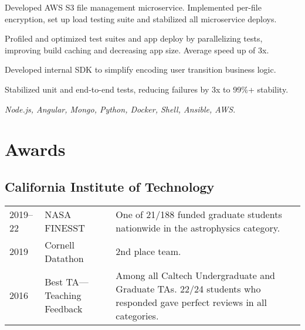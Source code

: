 \documentclass[]{yubo-resume-openfont}
\begin{document}
\begin{minipage}[t]{0.66\textwidth}
{    
    \begin{tightemize}
        \item Developed AWS S3 file management microservice. Implemented
            per-file encryption, set up load testing suite and stabilized all
            microservice deploys.
        \item Profiled and optimized test suites and app deploy by parallelizing
            tests, improving build caching and decreasing app size. Average
            speed up of 3x.
        \item Developed internal SDK to simplify encoding user transition
            business logic.
        \item Stabilized unit and end-to-end tests, reducing failures by 3x to
            99\%+ stability.
        \item \emph{Node.js, Angular, Mongo, Python, Docker, Shell, Ansible,
            AWS}.
    \end{tightemize}
}

\ifisCS
    \ExperienceSec
    \ResearchSec
\else
    \ResearchSec
    \ExperienceSec
\fi


\section{Awards}
\subsection{California Institute of Technology}
\begin{tabular}{p{50pt}p{80pt}p{7.5cm}}
    2019--22 & NASA FINESST & One of 21/188 funded graduate students nationwide
    in the astrophysics category.\\
    2019 & Cornell Datathon & 2nd place team.\\
    2016 & Best TA---Teaching Feedback & Among all Caltech Undergraduate and
    Graduate TAs. 22/24 students who responded gave perfect reviews in all
    categories.\\
\end{tabular}
\sectionsep

\end{minipage}
\end{document}
